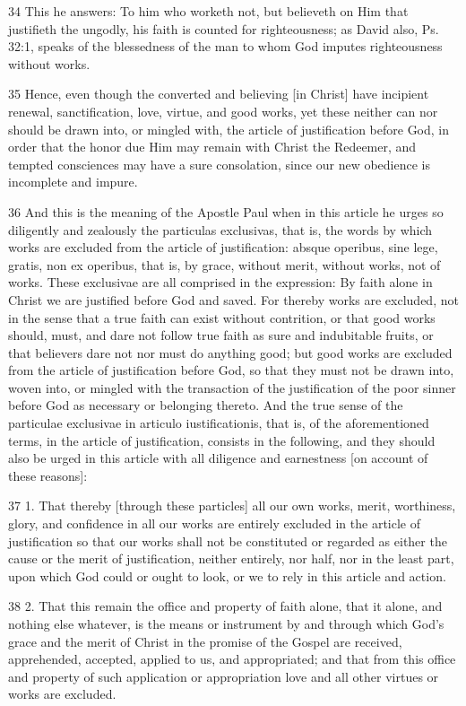 34 This he answers: To him who worketh not, but believeth on Him that justifieth the ungodly, his faith is counted for righteousness; as David also, Ps. 32:1, speaks of the blessedness of the man to whom God imputes righteousness without works.

35 Hence, even though the converted and believing [in Christ] have incipient renewal, sanctification, love, virtue, and good works, yet these neither can nor should be drawn into, or mingled with, the article of justification before God, in order that the honor due Him may remain with Christ the Redeemer, and tempted consciences may have a sure consolation, since our new obedience is incomplete and impure.

36 And this is the meaning of the Apostle Paul when in this article he urges so diligently and zealously the particulas exclusivas, that is, the words by which works are excluded from the article of justification: absque operibus, sine lege, gratis, non ex operibus, that is, by grace, without merit, without works, not of works. These exclusivae are all comprised in the expression: By faith alone in Christ we are justified before God and saved. For thereby works are excluded, not in the sense that a true faith can exist without contrition, or that good works should, must, and dare not follow true faith as sure and indubitable fruits, or that believers dare not nor must do anything good; but good works are excluded from the article of justification before God, so that they must not be drawn into, woven into, or mingled with the transaction of the justification of the poor sinner before God as necessary or belonging thereto. And the true sense of the particulae exclusivae in articulo iustificationis, that is, of the aforementioned terms, in the article of justification, consists in the following, and they should also be urged in this article with all diligence and earnestness [on account of these reasons]:

37 1. That thereby [through these particles] all our own works, merit, worthiness, glory, and confidence in all our works are entirely excluded in the article of justification so that our works shall not be constituted or regarded as either the cause or the merit of justification, neither entirely, nor half, nor in the least part, upon which God could or ought to look, or we to rely in this article and action.

38 2. That this remain the office and property of faith alone, that it alone, and nothing else whatever, is the means or instrument by and through which God’s grace and the merit of Christ in the promise of the Gospel are received, apprehended, accepted, applied to us, and appropriated; and that from this office and property of such application or appropriation love and all other virtues or works are excluded.

